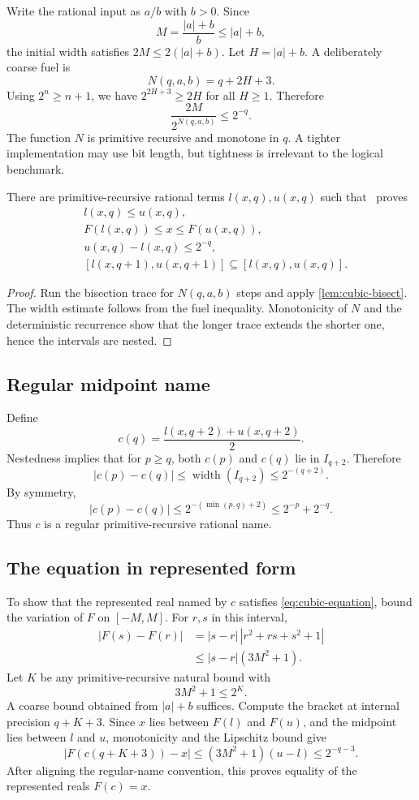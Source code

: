 Write the rational input as \(a/b\) with \(b>0\).  Since
\[
 M=\frac{|a|+b}{b}\le |a|+b,
\]
the initial width satisfies \(2M\le 2(|a|+b)\).  Let \(H=|a|+b\).  A deliberately coarse fuel is
\[
 N(q,a,b)=q+2H+3.
\]
Using \(2^n\ge n+1\), we have \(2^{2H+3}\ge 2H\) for all \(H\ge1\).  Therefore
\[
 \frac{2M}{2^{N(q,a,b)}}\le 2^{-q}.
\]
The function \(N\) is primitive recursive and monotone in \(q\).  A tighter implementation may use bit length, but tightness is irrelevant to the logical benchmark.

\begin{theorem}\label{thm:cubic-enclosure}
There are primitive-recursive rational terms \(l(x,q),u(x,q)\) such that \iPRA\ proves
\begin{align*}
 &l(x,q)\le u(x,q),\\
 &F(l(x,q))\le x\le F(u(x,q)),\\
 &u(x,q)-l(x,q)\le2^{-q},\\
 &[l(x,q+1),u(x,q+1)]\subseteq[l(x,q),u(x,q)].
\end{align*}
\end{theorem}

\begin{proof}
Run the bisection trace for \(N(q,a,b)\) steps and apply \cref{lem:cubic-bisect}.  The width estimate follows from the fuel inequality.  Monotonicity of \(N\) and the deterministic recurrence show that the longer trace extends the shorter one, hence the intervals are nested.
\end{proof}

\subsection{Regular midpoint name}

Define
\[
 c(q)=\frac{l(x,q+2)+u(x,q+2)}2.
\]
Nestedness implies that for \(p\ge q\), both \(c(p)\) and \(c(q)\) lie in \(I_{q+2}\).  Therefore
\[
 |c(p)-c(q)|\le \operatorname{width}(I_{q+2})\le2^{-(q+2)}.
\]
By symmetry,
\[
 |c(p)-c(q)|\le2^{-(\min(p,q)+2)}
 \le2^{-p}+2^{-q}.
\]
Thus \(c\) is a regular primitive-recursive rational name.

\subsection{The equation in represented form}

To show that the represented real named by \(c\) satisfies \eqref{eq:cubic-equation}, bound the variation of \(F\) on \([-M,M]\).  For \(r,s\) in this interval,
\begin{align*}
 |F(s)-F(r)|
 &=|s-r|\,|r^2+rs+s^2+1|\\
 &\le |s-r|(3M^2+1).
\end{align*}
Let \(K\) be any primitive-recursive natural bound with
\[
 3M^2+1\le2^K.
\]
A coarse bound obtained from \(|a|+b\) suffices.  Compute the bracket at internal precision \(q+K+3\).  Since \(x\) lies between \(F(l)\) and \(F(u)\), and the midpoint lies between \(l\) and \(u\), monotonicity and the Lipschitz bound give
\[
 |F(c(q+K+3))-x|\le (3M^2+1)(u-l)\le2^{-q-3}.
\]
After aligning the regular-name convention, this proves equality of the represented reals \(F(c)=x\).

